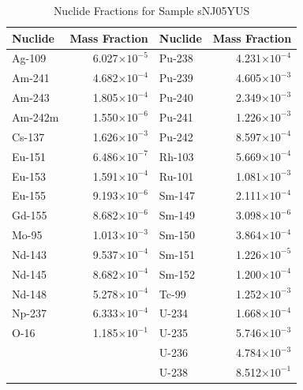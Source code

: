 \begin{table}[H]
\centering
\caption{Nuclide Fractions for Sample sNJ05YUS}
\begin{tabular}{lr|lr}
\hline
\textbf{Nuclide} & \textbf{Mass Fraction} & \textbf{Nuclide} & \textbf{Mass Fraction} \\
\hline
Ag-109 & 6.027$\times10^{-5}$ & Pu-238 & 4.231$\times10^{-4}$ \\
Am-241 & 4.682$\times10^{-4}$ & Pu-239 & 4.605$\times10^{-3}$ \\
Am-243 & 1.805$\times10^{-4}$ & Pu-240 & 2.349$\times10^{-3}$ \\
Am-242m & 1.550$\times10^{-6}$ & Pu-241 & 1.226$\times10^{-3}$ \\
Cs-137 & 1.626$\times10^{-3}$ & Pu-242 & 8.597$\times10^{-4}$ \\
Eu-151 & 6.486$\times10^{-7}$ & Rh-103 & 5.669$\times10^{-4}$ \\
Eu-153 & 1.591$\times10^{-4}$ & Ru-101 & 1.081$\times10^{-3}$ \\
Eu-155 & 9.193$\times10^{-6}$ & Sm-147 & 2.111$\times10^{-4}$ \\
Gd-155 & 8.682$\times10^{-6}$ & Sm-149 & 3.098$\times10^{-6}$ \\
Mo-95 & 1.013$\times10^{-3}$ & Sm-150 & 3.864$\times10^{-4}$ \\
Nd-143 & 9.537$\times10^{-4}$ & Sm-151 & 1.226$\times10^{-5}$ \\
Nd-145 & 8.682$\times10^{-4}$ & Sm-152 & 1.200$\times10^{-4}$ \\
Nd-148 & 5.278$\times10^{-4}$ & Tc-99 & 1.252$\times10^{-3}$ \\
Np-237 & 6.333$\times10^{-4}$ & U-234 & 1.668$\times10^{-4}$ \\
O-16 & 1.185$\times10^{-1}$ & U-235 & 5.746$\times10^{-3}$ \\
 & & U-236 & 4.784$\times10^{-3}$ \\
 & & U-238 & 8.512$\times10^{-1}$ \\
\hline
\end{tabular}
\label{tab:nuclide_mass_fractions}
\end{table}


